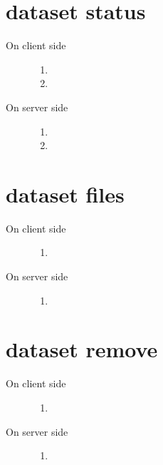 \documentclass{scrreprt}
\begin{document}
\section{dataset status} 
\begin{description}

%
\item[On client side] \hfill
\begin{enumerate} 
\item 
\item

\end{enumerate}
%
\item[On server side] \hfill
\begin{enumerate} 
\item 
\item

\end{enumerate}

\end{description}



\section{dataset files} 
\begin{description}

%
\item[On client side] \hfill
\begin{enumerate} 
\item

\end{enumerate}
%
\item[On server side] \hfill
\begin{enumerate} 
\item

\end{enumerate}

\end{description}



\section{dataset remove} 
\begin{description}

%
\item[On client side] \hfill
\begin{enumerate} 
\item

\end{enumerate}
%
\item[On server side] \hfill
\begin{enumerate} 
\item

\end{enumerate}

\end{description}
\end{document}
